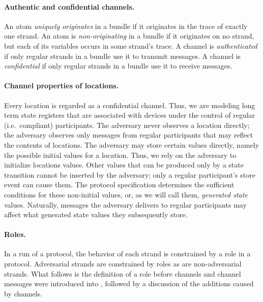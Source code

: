 \documentclass[12pt]{report}
\theoremstyle{definition}
\begin{document}
\paragraph{Authentic and confidential channels.}  An atom
\emph{uniquely originates} in a bundle if
it originates in the trace of exactly one strand.  An atom is
\emph{non-originating} in a bundle if it
originates on no strand, but each of its variables occurs in some
strand's trace.  A channel is \emph{authenticated} if only regular strands in a bundle use
it to transmit messages.  A channel is \emph{confidential} if only regular strands in a bundle use
it to receive messages.

\paragraph{Channel properties of locations.}  Every location is
regarded as a confidential channel.  Thus, we are modeling long term
state registers that are associated with devices under the control of
regular (i.e.~compliant) participants.  The adversary never observes a
location directly; the adversary observes only messages from regular
participants that may reflect the contents of locations.  The
adversary may store certain values directly, namely the possible
initial values for a location.  Thus, we rely on the adversary to
initialize locations values.  Other values that can be produced only
by a state transition cannot be inserted by the adversary; only a
regular participant's store event can cause them.  The protocol
specification determines the sufficient conditions for these
non-initial values, or, as we will call them, \emph{generated state}
values.  Naturally, messages the adversary delivers to regular
participants may affect what generated state values they subsequently
store.

\paragraph{Roles.}  In a run of a protocol, the behavior of each
strand is constrained by a role in a protocol.  Adversarial strands
are constrained by roles as are non-adversarial strands.  What follows
is the definition of a role before channels and channel messages were
introduced into {\cpsa}, followed by a discussion of the additions
caused by channels.
\end{document}
